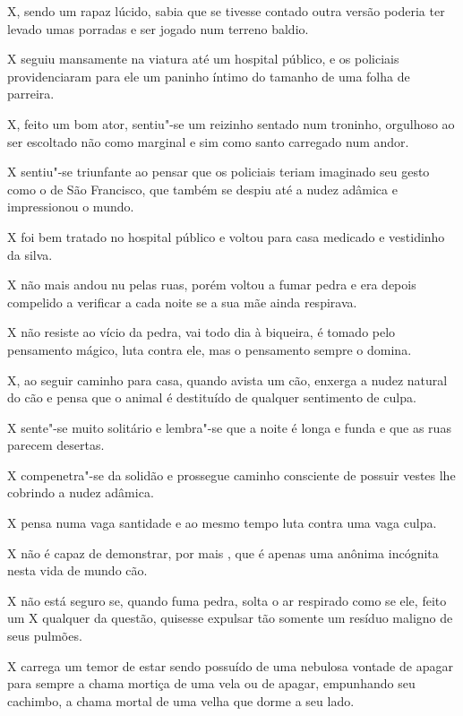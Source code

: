 X, sendo um rapaz lúcido, sabia que se tivesse contado outra versão
poderia ter levado umas porradas e ser jogado num terreno baldio.

X seguiu mansamente na viatura até um hospital público, e os policiais
providenciaram para ele um paninho íntimo do tamanho de uma folha de
parreira.

X, feito um bom ator, sentiu"-se um reizinho sentado num troninho,
orgulhoso ao ser escoltado não como marginal e sim como santo carregado
num andor.

X sentiu"-se triunfante ao pensar que os policiais teriam imaginado seu
gesto como o de São Francisco, que também se despiu até a nudez adâmica
e impressionou o mundo.

X foi bem tratado no hospital público e voltou para casa medicado e
vestidinho da silva.

X não mais andou nu pelas ruas, porém voltou a fumar pedra e era depois
compelido a verificar a cada noite se a sua mãe ainda respirava.

X não resiste ao vício da pedra, vai todo dia à biqueira, é tomado pelo
pensamento mágico, luta contra ele, mas o pensamento sempre o domina.

X, ao seguir caminho para casa, quando avista um cão, enxerga a nudez
natural do cão e pensa que o animal é destituído de qualquer sentimento
de culpa.

X sente"-se muito solitário e lembra"-se que a noite é longa e funda e que
as ruas parecem desertas.

X compenetra"-se da solidão e prossegue caminho consciente de possuir
vestes lhe cobrindo a nudez adâmica.

X pensa numa vaga santidade e ao mesmo tempo luta contra uma vaga culpa.

X não é capaz de demonstrar, por  mais , que é apenas uma anônima
incógnita nesta vida de mundo cão.

X não está seguro se, quando fuma pedra, solta o ar respirado como se
ele, feito um X qualquer da questão, quisesse expulsar tão somente um
resíduo maligno de seus pulmões.

X carrega um temor de estar sendo possuído de uma nebulosa vontade de
apagar para sempre a chama mortiça de uma vela ou de apagar, empunhando
seu cachimbo, a chama mortal de uma velha que dorme a seu lado.

\begin{center}\asterisc{}\end{center}

